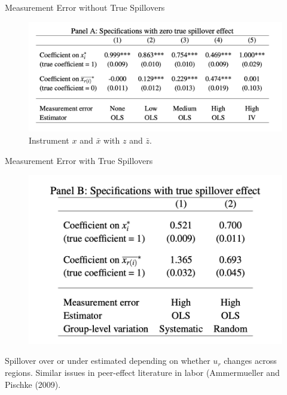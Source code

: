 \documentclass[english,xcolor=svgnames]{beamer}
\begin{document}
\begin{frame}{Measurement Error without True Spillovers}
\begin{figure}
\includegraphics[scale=0.35]{figures/h_ge_1}\\
Instrument $x$ and $\bar{x}$ with $z$ and $\bar{z}$.
\end{figure}
\end{frame}

\begin{frame}{Measurement Error with True Spillovers}
\begin{figure}
\includegraphics[scale=0.35]{figures/h_ge_2}\\
 \end{figure}
 Spillover over or under estimated depending on whether $u_r$ changes across regions. Similar issues in peer-effect literature in labor (Ammermueller and Pischke (2009).
\end{frame}
\end{document}
